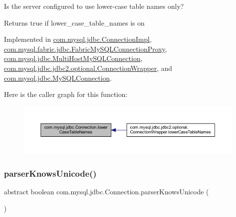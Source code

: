 Is the server configured to use lower-\/case table names only?

\begin{DoxyReturn}{Returns}
true if lower\+\_\+case\+\_\+table\+\_\+names is \textquotesingle{}on\textquotesingle{} 
\end{DoxyReturn}


Implemented in \mbox{\hyperlink{classcom_1_1mysql_1_1jdbc_1_1_connection_impl_a50a7db180dd968c196dfd94f2bb476fb}{com.\+mysql.\+jdbc.\+Connection\+Impl}}, \mbox{\hyperlink{classcom_1_1mysql_1_1fabric_1_1jdbc_1_1_fabric_my_s_q_l_connection_proxy_a422ca39e48b5e586ff207190c6793193}{com.\+mysql.\+fabric.\+jdbc.\+Fabric\+My\+S\+Q\+L\+Connection\+Proxy}}, \mbox{\hyperlink{classcom_1_1mysql_1_1jdbc_1_1_multi_host_my_s_q_l_connection_a0d35ab03e1820d4895d11f35d7b9a9ac}{com.\+mysql.\+jdbc.\+Multi\+Host\+My\+S\+Q\+L\+Connection}}, \mbox{\hyperlink{classcom_1_1mysql_1_1jdbc_1_1jdbc2_1_1optional_1_1_connection_wrapper_a1c95dda9f599a78aef9acb5cf854b99b}{com.\+mysql.\+jdbc.\+jdbc2.\+optional.\+Connection\+Wrapper}}, and \mbox{\hyperlink{interfacecom_1_1mysql_1_1jdbc_1_1_my_s_q_l_connection_a5b25c6fb6c56e77ebc6989179da0dd75}{com.\+mysql.\+jdbc.\+My\+S\+Q\+L\+Connection}}.

Here is the caller graph for this function\+:\nopagebreak
\begin{figure}[H]
\begin{center}
\leavevmode
\includegraphics[width=350pt]{interfacecom_1_1mysql_1_1jdbc_1_1_connection_a18c9cf0dc2d7ca1f69a3435eb4dbfde2_icgraph}
\end{center}
\end{figure}
\mbox{\label{interfacecom_1_1mysql_1_1jdbc_1_1_connection_a09e06dca89e57de8d11e9e9ff2d78f4d}} 
\subsubsection{\texorpdfstring{parser\+Knows\+Unicode()}{parserKnowsUnicode()}}
{\footnotesize\ttfamily abstract boolean com.\+mysql.\+jdbc.\+Connection.\+parser\+Knows\+Unicode (\begin{DoxyParamCaption}{ }\end{DoxyParamCaption})\hspace{0.3cm}{\ttfamily [abstract]}}

